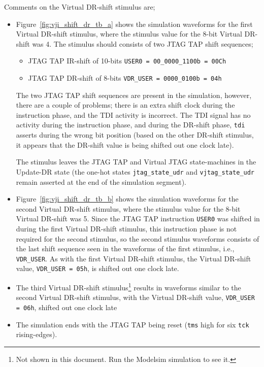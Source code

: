\documentclass[10pt,twoside]{article}
\begin{document}
\clearpage
\noindent Comments on the Virtual DR-shift stimulus are;
\begin{itemize}
\item Figure~\ref{fig:vji_shift_dr_tb_a} shows the simulation waveforms
for the first Virtual DR-shift stimulus, where the stimulus value for the
8-bit Virtual DR-shift was 4. The stimulus should consists of two JTAG TAP
shift sequences;
%
\begin{itemize}
\item JTAG TAP IR-shift of 10-bits \verb+USER0 = 00_0000_1100b = 00Ch+
\item JTAG TAP DR-shift of 8-bits \verb+VDR_USER = 0000_0100b = 04h+
\end{itemize}
%
The two JTAG TAP shift sequences are present in the simulation,
however, there are a couple of problems; there is an extra shift
clock during the instruction phase, and the TDI activity is incorrect.
The TDI signal has no activity during the instruction phase, and 
during the DR-shift phase, \verb+tdi+ asserts during the wrong bit
position (based on the other DR-shift stimulus, it appears that the
DR-shift value is being shifted out one clock late).

The stimulus leaves the JTAG TAP and Virtual JTAG state-machines
in the Update-DR state
(the one-hot states \verb+jtag_state_udr+ and \verb+vjtag_state_udr+ 
remain asserted at the end of the
simulation segment).
%
\item Figure~\ref{fig:vji_shift_dr_tb_b} shows the simulation waveforms
for the second Virtual DR-shift stimulus, where the stimulus value for the
8-bit Virtual DR-shift was 5. 
Since the JTAG TAP instruction \verb+USER0+ was shifted
in during the first Virtual DR-shift stimulus, this instruction phase
is not required for the second stimulus, so the second stimulus waveforms
consists of the last shift sequence seen in the
waveforms of the first stimulus, i.e., \verb+VDR_USER+. 
As with the first Virtual DR-shift stimulus,
the Virtual DR-shift value, \verb+VDR_USER = 05h+, is shifted
out one clock late.
%
\item The third Virtual DR-shift stimulus\footnote{Not shown in this
document. Run the Modelsim simulation to see it.} results in 
waveforms similar to the second Virtual DR-shift 
stimulus, with the Virtual DR-shift value, \verb+VDR_USER = 06h+,
shifted out one clock late
%
\item The simulation ends with the JTAG TAP being reset
(\verb+tms+ high for six \verb+tck+ rising-edges).
%
\end{itemize}
\end{document}
